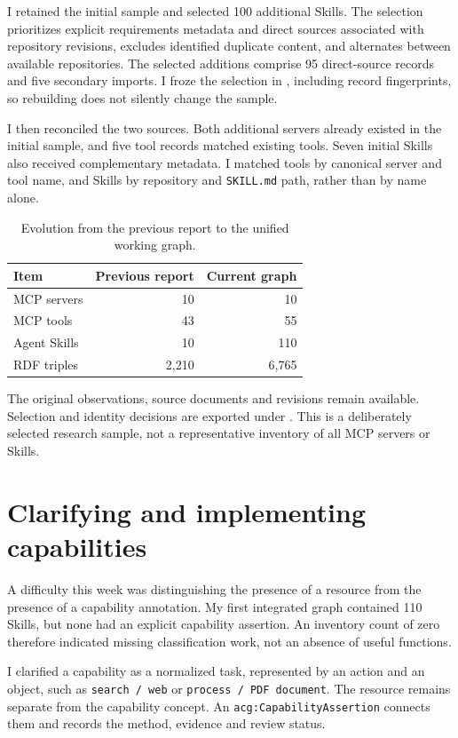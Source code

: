 \documentclass[11pt,a4paper]{article}
\begin{document}
I retained the initial sample and selected 100 additional Skills. The selection prioritizes explicit requirements metadata and direct sources associated with repository revisions, excludes identified duplicate content, and alternates between available repositories. The selected additions comprise 95 direct-source records and five secondary imports. I froze the selection in , including record fingerprints, so rebuilding does not silently change the sample.

I then reconciled the two sources. Both additional servers already existed in the initial sample, and five tool records matched existing tools. Seven initial Skills also received complementary metadata. I matched tools by canonical server and tool name, and Skills by repository and \texttt{SKILL.md} path, rather than by name alone.

\begin{table}[htbp]
\centering
\caption{Evolution from the previous report to the unified working graph.}
\begin{tabular}{lrr}
\toprule
\textbf{Item} & \textbf{Previous report} & \textbf{Current graph} \\
\midrule
MCP servers & 10 & 10 \\
MCP tools & 43 & 55 \\
Agent Skills & 10 & 110 \\
RDF triples & 2,210 & 6,765 \\
\bottomrule
\end{tabular}
\end{table}

The original observations, source documents and revisions remain available. Selection and identity decisions are exported under . This is a deliberately selected research sample, not a representative inventory of all MCP servers or Skills.

\section{Clarifying and implementing capabilities}

A difficulty this week was distinguishing the presence of a resource from the presence of a capability annotation. My first integrated graph contained 110 Skills, but none had an explicit capability assertion. An inventory count of zero therefore indicated missing classification work, not an absence of useful functions.

I clarified a capability as a normalized task, represented by an action and an object, such as \texttt{search / web} or \texttt{process / PDF document}. The resource remains separate from the capability concept. An \texttt{acg:CapabilityAssertion} connects them and records the method, evidence and review status.
\end{document}
